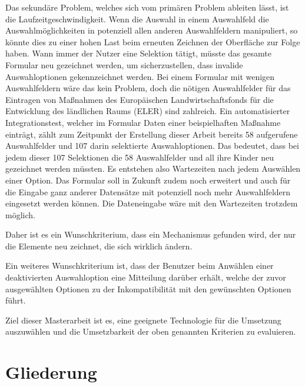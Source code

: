 Das sekundäre Problem,
welches sich vom primären Problem ableiten lässt,
ist die  Laufzeitgeschwindigkeit. 
Wenn die Auswahl in einem Auswahlfeld die Auswahlmöglichkeiten in potenziell allen anderen Auswahlfeldern manipuliert,
so könnte dies zu einer hohen Last beim erneuten Zeichnen der Oberfläche zur Folge haben.
Wann immer der Nutzer eine Selektion tätigt,
müsste das gesamte Formular neu gezeichnet werden,
um sicherzustellen,
dass invalide Auswahloptionen gekennzeichnet werden.
Bei einem  Formular mit wenigen Auswahlfeldern wäre das kein Problem,
doch die nötigen Auswahlfelder für das Eintragen von Maßnahmen des Europäischen Landwirtschaftsfonds für die Entwicklung des ländlichen Raums (ELER) sind zahlreich.
Ein  automatisierter Integrationstest,
welcher im Formular Daten einer beispielhaften Maßnahme einträgt,
zählt zum Zeitpunkt der Erstellung dieser Arbeit bereits 58 aufgerufene Auswahlfelder und 107 darin selektierte Auswahloptionen.
Das bedeutet,
dass bei jedem dieser 107 Selektionen die 58 Auswahlfelder und all ihre Kinder neu gezeichnet werden müssten.
Es entstehen also Wartezeiten nach jedem Auswählen einer Option.
Das Formular soll in Zukunft zudem noch erweitert und auch für die Eingabe ganz anderer Datensätze mit potenziell noch mehr Auswahlfeldern eingesetzt werden können.
Die Dateneingabe wäre mit den Wartezeiten trotzdem möglich.
\begin{newText}Daher ist es ein Wunschkriterium, dass ein Mechanismus gefunden wird,
der nur die Elemente neu zeichnet, die sich wirklich ändern.\end{newText}

Ein weiteres Wunschkriterium ist,
dass der Benutzer beim Anwählen einer deaktivierten Auswahloption eine Mitteilung darüber erhält,
welche der zuvor ausgewählten Optionen zu der Inkompatibilität mit den gewünschten Optionen führt.

Ziel dieser Masterarbeit ist es, eine geeignete Technologie für die Umsetzung auszuwählen
und die Umsetzbarkeit der  oben genannten Kriterien zu evaluieren.

\section{Gliederung}


